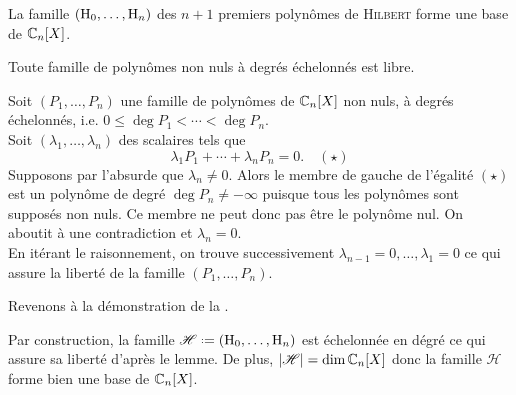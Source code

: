 \begin{prop} 
    La famille $(\mathrm{H}_0, \dots, \mathrm{H}_n)$ des $n+1$ premiers polynômes de \textsc{Hilbert} forme une base de $\mathbb{C}_n[X]$.
\end{prop}

\begin{lemme} 
    Toute famille de polynômes non nuls à degrés échelonnés est libre.
\end{lemme}

\begin{preuve}
    Soit $(P_1, \dots, P_n)$ une famille de polynômes de $\mathbb{C}_n[X]$ non nuls, à degrés échelonnés, i.e. $0 \leqslant \deg P_1 < \cdots < \deg P_n$. \\
    Soit $(\lambda_1, \dots, \lambda_n)$ des scalaires tels que
    $$\lambda_1 P_1 + \cdots + \lambda_n P_n = 0. \quad (\star)$$
    Supposons par l'absurde que $\lambda_n \not= 0$. Alors le membre de gauche de l'égalité $(\star)$ est un polynôme de degré $\deg P_n \not= - \infty$ puisque tous les polynômes sont supposés non nuls. Ce membre ne peut donc pas être le polynôme nul. On aboutit à une contradiction et $\lambda_n = 0$. \\ 
    En itérant le raisonnement, on trouve successivement $\lambda_{n-1} = 0, \dots, \lambda_1 = 0$ ce qui assure la liberté de la famille $(P_1, \dots, P_n)$.
\end{preuve}

Revenons à la démonstration de la .

\begin{preuve}
    Par construction, la famille $\mathscr{H} \defeq (\Hilb_0, \dots, \Hilb_n)$ est échelonnée en dégré \note ce qui assure sa liberté d'après le lemme. De plus, $|\mathscr{H}| = \dim \mathbb{C}_n[X]$ donc la famille $\mathscr{H}$ forme bien une base de $\mathbb{C}_n[X]$.
\end{preuve}
